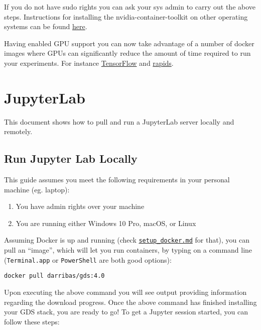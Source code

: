 \documentclass[
]{book}
\providecommand{\tightlist}{%
  \setlength{\itemsep}{0pt}\setlength{\parskip}{0pt}}
\begin{document}
If you do not have sudo rights you can ask your sys admin to carry out the above steps. Instructions for installing the nvidia-container-toolkit on other operating systems can be found \href{https://github.com/NVIDIA/nvidia-docker}{here}.

Having enabled GPU support you can now take advantage of a number of docker images where GPUs can significantly reduce the amount of time required to run your experiments. For instance \href{https://www.tensorflow.org/install/docker}{TensorFlow} and \href{https://rapids.ai/start.html}{rapids}.

\hypertarget{jupyterlab}{%
\chapter{JupyterLab}\label{jupyterlab}}

This document shows how to pull and run a JupyterLab server locally and
remotely.

\hypertarget{run-jupyter-lab-locally}{%
\section{Run Jupyter Lab Locally}\label{run-jupyter-lab-locally}}

This guide assumes you meet the following requirements in your personal
machine (eg. laptop):

\begin{enumerate}
\def\labelenumi{\arabic{enumi}.}
\tightlist
\item
  You have admin rights over your machine
\item
  You are running either Windows 10 Pro, macOS, or Linux
\end{enumerate}

Assuming Docker is up and running (check \href{setup_docker.md}{\texttt{setup\_docker.md}}
for that), you can pull an ``image'', which will let you
run containers, by typing on a command line (\texttt{Terminal.app} or \texttt{PowerShell}
are both good options):

\begin{verbatim}
docker pull darribas/gds:4.0
\end{verbatim}

Upon executing the above command you will see output providing information regarding the download progress.
Once the above command has finished installing your GDS stack, you are ready to go!
To get a Jupyter session started, you can follow these steps:
\end{document}
